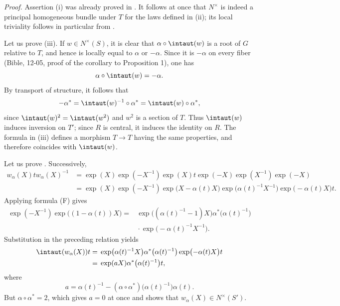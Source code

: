 
\noindent\emph{Proof.}
Assertion \textup{(i)} was already proved in . It
follows at once that \(N^\times\) is indeed a principal homogeneous
bundle under \(T\) for the laws defined in \textup{(ii)}; its local
triviality follows in particular from
\textup{}.

Let us prove \textup{(iii)}. If \(w\in N^\times(S)\), it is clear
that \(\alpha\circ\intaut(w)\) is a root of \(G\) relative to \(T\),
and hence is locally equal to \(\alpha\) or \(-\alpha\). Since it is
\(-\alpha\) on every fiber \textup{(Bible, 12-05, proof of the
corollary to Proposition 1)}, one has
\[
  \alpha\circ\intaut(w)=-\alpha.
\]
By transport of structure, it follows that
\[
  -\alpha^\ast
    =\intaut(w)^{-1}\circ\alpha^\ast
    =\intaut(w)\circ\alpha^\ast,
\]
since \(\intaut(w)^2=\intaut(w^2)\) and \(w^2\) is a section of
\(T\). Thus \(\intaut(w)\) induces inversion on \(T'\); since \(R\)
is central, it induces the identity on \(R\). The formula in
\textup{(iii)} defines a morphism \(T\to T\) having the same
properties, and therefore coincides with \(\intaut(w)\).

Let us prove \textup{}. Successively,
\[
\begin{aligned}
  w_\alpha(X)t w_\alpha(X)^{-1}
    &={}\exp(X)\exp(-X^{-1})\exp(X)t
       \exp(-X)\exp(X^{-1})\exp(-X)\\
    &={}\exp(X)\exp(-X^{-1})
       \exp\bigl(X-\alpha(t)X\bigr)
       \exp\bigl(\alpha(t)^{-1}X^{-1}\bigr)
       \exp\bigl(-\alpha(t)X\bigr)t.
\end{aligned}
\]
Applying formula \textup{(F)} gives
\[
\begin{aligned}
  \exp(-X^{-1})\exp\bigl((1-\alpha(t))X\bigr)
    ={}&\exp\bigl((\alpha(t)^{-1}-1)X\bigr)
       \alpha^\ast\bigl(\alpha(t)^{-1}\bigr)\\
     &{}\cdot\exp\bigl(-\alpha(t)^{-1}X^{-1}\bigr).
\end{aligned}
\]
Substitution in the preceding relation yields
\[
\begin{aligned}
  \intaut(w_\alpha(X))t
    &={}\exp\bigl(\alpha(t)^{-1}X\bigr)
       \alpha^\ast\bigl(\alpha(t)^{-1}\bigr)
       \exp\bigl(-\alpha(t)X\bigr)t\\
    &={}\exp(aX)\alpha^\ast\bigl(\alpha(t)^{-1}\bigr)t,
\end{aligned}
\]
where
\[
  a=\alpha(t)^{-1}
     -(\alpha\circ\alpha^\ast)\bigl(\alpha(t)^{-1}\bigr)\alpha(t).
\]
But \(\alpha\circ\alpha^\ast=2\), which gives \(a=0\) at once and
shows that \(w_\alpha(X)\in N^\times(S')\).

